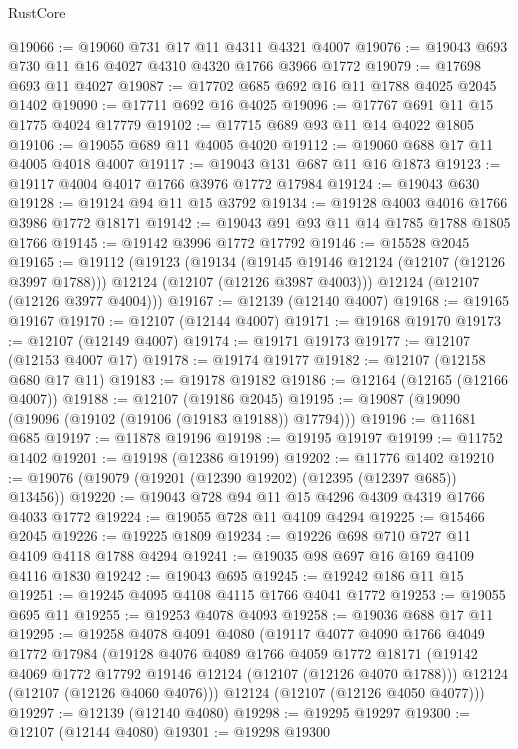 \begin{lexlean}{RustCore}
\begin{coremodule}
@19066 := @19060 @731 @17 @11 @4311 @4321 @4007
@19076 := @19043 @693 @730 @11 @16 @4027 @4310 @4320 @1766 @3966 @1772
@19079 := @17698 @693 @11 @4027
@19087 := @17702 @685 @692 @16 @11 @1788 @4025 @2045 @1402
@19090 := @17711 @692 @16 @4025
@19096 := @17767 @691 @11 @15 @1775 @4024 @17779
@19102 := @17715 @689 @93 @11 @14 @4022 @1805
@19106 := @19055 @689 @11 @4005 @4020
@19112 := @19060 @688 @17 @11 @4005 @4018 @4007
@19117 := @19043 @131 @687 @11 @16 @1873
@19123 := @19117 @4004 @4017 @1766 @3976 @1772 @17984
@19124 := @19043 @630
@19128 := @19124 @94 @11 @15 @3792
@19134 := @19128 @4003 @4016 @1766 @3986 @1772 @18171
@19142 := @19043 @91 @93 @11 @14 @1785 @1788 @1805 @1766
@19145 := @19142 @3996 @1772 @17792
@19146 := @15528 @2045
@19165 := @19112
    (@19123
      (@19134
        (@19145 @19146 @12124 (@12107 (@12126 @3997 @1788)))
        @12124
        (@12107 (@12126 @3987 @4003)))
      @12124
      (@12107 (@12126 @3977 @4004)))
@19167 := @12139 (@12140 @4007)
@19168 := @19165 @19167
@19170 := @12107 (@12144 @4007)
@19171 := @19168 @19170
@19173 := @12107 (@12149 @4007)
@19174 := @19171 @19173
@19177 := @12107 (@12153 @4007 @17)
@19178 := @19174 @19177
@19182 := @12107 (@12158 @680 @17 @11)
@19183 := @19178 @19182
@19186 := @12164 (@12165 (@12166 @4007))
@19188 := @12107 (@19186 @2045)
@19195 := @19087 (@19090 (@19096 (@19102 (@19106 (@19183 @19188)) @17794)))
@19196 := @11681 @685
@19197 := @11878 @19196
@19198 := @19195 @19197
@19199 := @11752 @1402
@19201 := @19198 (@12386 @19199)
@19202 := @11776 @1402
@19210 := @19076 (@19079 (@19201 (@12390 @19202) (@12395 (@12397 @685)) @13456))
@19220 := @19043 @728 @94 @11 @15 @4296 @4309 @4319 @1766 @4033 @1772
@19224 := @19055 @728 @11 @4109 @4294
@19225 := @15466 @2045
@19226 := @19225 @1809
@19234 := @19226 @698 @710 @727 @11 @4109 @4118 @1788 @4294
@19241 := @19035 @98 @697 @16 @169 @4109 @4116 @1830
@19242 := @19043 @695
@19245 := @19242 @186 @11 @15
@19251 := @19245 @4095 @4108 @4115 @1766 @4041 @1772
@19253 := @19055 @695 @11
@19255 := @19253 @4078 @4093
@19258 := @19036 @688 @17 @11
@19295 := @19258
    @4078
    @4091
    @4080
    (@19117
      @4077
      @4090
      @1766
      @4049
      @1772
      @17984
      (@19128
        @4076
        @4089
        @1766
        @4059
        @1772
        @18171
        (@19142 @4069 @1772 @17792 @19146 @12124 (@12107 (@12126 @4070 @1788)))
        @12124
        (@12107 (@12126 @4060 @4076)))
      @12124
      (@12107 (@12126 @4050 @4077)))
@19297 := @12139 (@12140 @4080)
@19298 := @19295 @19297
@19300 := @12107 (@12144 @4080)
@19301 := @19298 @19300

\end{coremodule}
\end{lexlean}
